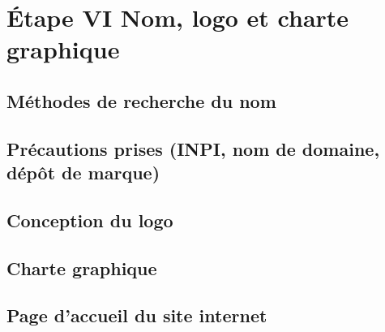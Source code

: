 \section{Étape VI \textendash{} Nom, logo et charte graphique}

\subsection{Méthodes de recherche du nom}

\subsection{Précautions prises (INPI, nom de domaine, dépôt de marque)}

\subsection{Conception du logo}

\subsection{Charte graphique}

\subsection{Page d'accueil du site internet}
